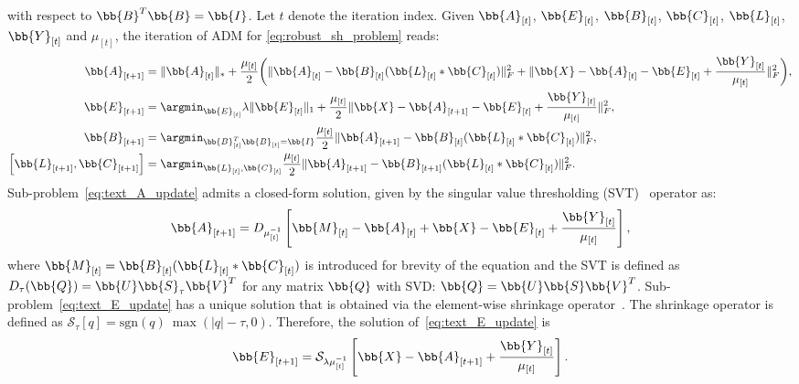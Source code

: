 with respect to $\bb{B}^T \bb{B} = \bb{I}$. Let $t$ denote the iteration index.
Given $\bb{A}_{[t]}$, $\bb{E}_{[t]}$, $\bb{B}_{[t]}$, $\bb{C}_{[t]}$, $\bb{L}_{[t]}$, $\bb{Y}_{[t]}$
and $\mu_{[t]}$, the iteration of ADM for \cref{eq:robust_sh_problem} reads:
\begin{align}
    \bb{A}_{[t+1]} &= \lVert \bb{A}_{[t]} \rVert_{*} + \frac{\mu_{[t]}}{2} \biggl( \lVert \bb{A}_{[t]} - \bb{B}_{[t]} (\bb{L}_{[t]} \ast \bb{C}_{[t]}) \rVert^{2}_{F} + \lVert \bb{X} - \bb{A}_{[t]} - \bb{E}_{[t]} + \frac{\bb{Y}_{[t]}}{\mu_{[t]}} \rVert_{F}^{2} \biggr), \label{eq:text_A_update} \\
    \bb{E}_{[t+1]} &= \argmin_{\bb{E}_{[t]}} \lambda \lVert \bb{E}_{[t]} \rVert_{1} + \frac{\mu_{[t]}}{2} \lVert \bb{X} - \bb{A}_{[t+1]} - \bb{E}_{[t]} + \frac{\bb{Y}_{[t]}}{\mu_{[t]}} \rVert_{F}^{2}, \label{eq:text_E_update} \\
    \bb{B}_{[t+1]} &= \argmin_{\bb{B}_{[t]}^T \bb{B}_{[t]} = \bb{I}} \frac{\mu_{[t]}}{2} \lVert \bb{A}_{[t+1]} - \bb{B}_{[t]} (\bb{L}_{[t]} \ast \bb{C}_{[t]}) \rVert_{F}^{2}, \label{eq:text_B_update} \\
    \left[ \bb{L}_{[t+1]}, \bb{C}_{[t+1]} \right] &= \argmin_{\bb{L}_{[t]}, \bb{C}_{[t]}} \frac{\mu_{[t]}}{2} \lVert \bb{A}_{[t+1]} - \bb{B}_{[t+1]} (\bb{L}_{[t]} \ast \bb{C}_{[t]}) \rVert_{F}^{2}. \label{eq:text_LC_update}
\end{align}
Sub-problem~\eqref{eq:text_A_update} admits a closed-form solution, given by the
singular value thresholding (SVT)~\cite{cai2010singular} operator as:
\begin{equation}\label{eq:text_A_SVT}
    \bb{A}_{[t+1]} = D_{\mu_{[t]}^{-1}} \left[ \bb{M}_{[t]}  - \bb{A}_{[t]} + \bb{X} - \bb{E}_{[t]} + \frac{\bb{Y}_{[t]}}{\mu_{[t]}} \right],
\end{equation}
where $\bb{M}_{[t]} = \bb{B}_{[t]} (\bb{L}_{[t]} \ast \bb{C}_{[t]})$ is introduced
for brevity of the equation and the SVT is defined as
$D_{\tau}(\bb{Q}) = \bb{U} \bb{S}_{\tau} \bb{V}^T$ for any matrix $\bb{Q}$ with SVD:\@
$\bb{Q} = \bb{U} \bb{S} \bb{V}^T$.
Sub-problem~\eqref{eq:text_E_update} has a unique solution that is obtained via
the element-wise shrinkage operator~\cite{candes2011robust}. The shrinkage operator
is defined as $\mathcal{S}_{\tau}[q]=\mbox{sgn}(q) \: \max(|q|-\tau, 0)$.
Therefore, the solution of~\eqref{eq:text_E_update} is
\begin{equation}\label{eq:text_E_shrinkage}
    \bb{E}_{[t+1]} = \mathcal{S}_{\lambda \mu_{[t]}^{-1}} \left[ \bb{X} - \bb{A}_{[t+1]} + \frac{\bb{Y}_{[t]}}{\mu_{[t]}} \right].
\end{equation}
